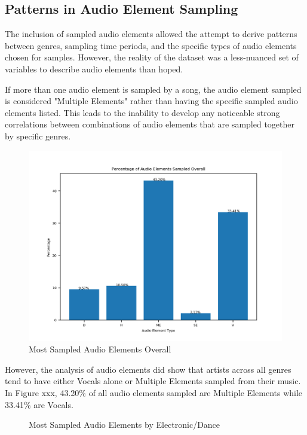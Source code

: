\documentclass[pageno]{jpaper}
\begin{document}
\subsection{Patterns in Audio Element Sampling}
The inclusion of sampled audio elements allowed the attempt to derive patterns between genres, sampling time periods, and the specific types of audio elements chosen for samples. However, the reality of the dataset was a less-nuanced set of variables to describe audio elements than hoped.

If more than one audio element is sampled by a song, the audio element sampled is considered "Multiple Elements" rather than having the specific sampled audio elements listed. This leads to the inability to develop any noticeable strong correlations between combinations of audio elements that are sampled together by specific genres.
\begin{figure}[H]
\includegraphics{audioElemSampledOverall}
\caption{Most Sampled Audio Elements Overall}
\centering
\end{figure}
However, the analysis of audio elements did show that artists across all genres tend to have either Vocals alone or Multiple Elements sampled from their music. In Figure xxx, 43.20\% of all audio elements sampled are Multiple Elements while 33.41\% are Vocals. 
\begin{figure}[H]
\centering
\caption{Most Sampled Audio Elements by Hip-Hop/R\&B}\caption{Most Sampled Audio Elements by Electronic/Dance}
\end{figure}
\end{document}

